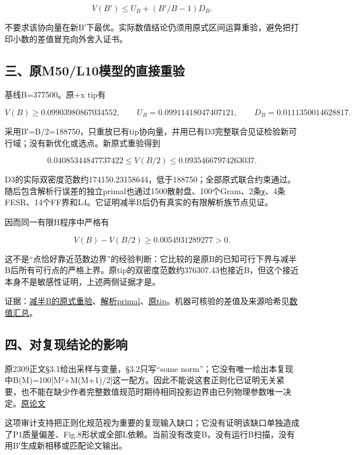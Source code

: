 \documentclass[
  10pt,
  a4paper,
]{article}
\begin{document}
\[
V(B')\le U_B+(B'/B-1)D_B.
\]

不要求该协向量在新B′下最优。实际数值结论仍须用原式区间运算重验，避免把打印小数的差值冒充向外舍入证书。

\subsection{三、原M50/L10模型的直接重验}\label{ux4e09ux539fm50l10ux6a21ux578bux7684ux76f4ux63a5ux91cdux9a8c}

基线B=377500。原+x tip有

\[
V(B)\ge0.09903980867034552,
\qquad U_B=0.09911418047407121,
\qquad D_B=0.0111350014628817.
\]

采用B′=B/2=188750，只重放已有tip协向量，并用已有D3完整联合见证检验新可行域；没有新优化或选点。新原式重验得到

\[
0.04085344847737422\le V(B/2)\le0.09354667974263037.
\]

D3的实际双密度范数约174150.23158644，低于188750；全部原式联合约束通过。随后包含解析行误差的独立primal也通过1500散射盘、100个Gram、2条χ、4条FESR、14个FF界和L4。它证明减半B后仍有真实的有限解析族节点见证。

因而同一有限H程序中严格有

\[
V(B)-V(B/2)\ge0.0054931289277>0.
\]

这不是``点恰好靠近范数边界''的经验判断：它比较的是原B的已知可行下界与减半B后所有可行点的严格上界。原tip的双密度范数约376307.43也接近B，但这个接近本身不是敏感性证明，上述两侧证据才是。

证据：\href{../regularizer_half_bound_replay/report.json}{减半B的原式重验}、\href{../regularizer_half_analytic/source_audit.json}{解析primal}、\href{../../sequential_reproduction_20260910/E1_tip_center/report.json}{原tip}。机器可核验的差值及来源哈希见\href{../REGULARIZATION_VALUE_PROOF.json}{数值汇总}。

\subsection{四、对复现结论的影响}\label{ux56dbux5bf9ux590dux73b0ux7ed3ux8bbaux7684ux5f71ux54cd}

原2309正文§3.1给出采样与变量，§3.2只写``some
norm''；它没有唯一给出本复现中B(M)=100{[}M²+M(M+1)/2{]}这一配方。因此不能说这套正则化已证明无关紧要，也不能在缺少作者完整数值规范时期待相同投影边界由已列物理参数唯一决定。\href{https://arxiv.org/abs/2309.12402v3}{原论文}

这项审计支持把正则化规范视为重要的复现输入缺口；它没有证明该缺口单独造成了P1质量偏差、Fig.8形状或全部L依赖。当前没有改变B，没有运行B扫描，没有用B′生成新相移或匹配论文输出。
\end{document}
